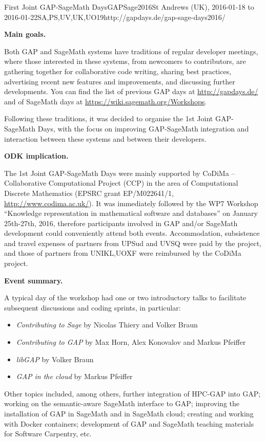 \begin{event}{First Joint GAP-SageMath Days}{GAPSage2016}{St Andrews (UK),
2016-01-18 to 2016-01-22}{SA,PS,UV,UK,UO}{19}{http://gapdays.de/gap-sage-days2016/}

\textbf{Main goals.}

Both GAP and SageMath systems have traditions of regular developer meetings, where those
interested in these systems, from newcomers to contributors, are gathering together for
collaborative code writing, sharing best practices, advertising recent new features and
improvements, and discussing further developments. You can find the list of previous GAP 
days at \url{http://gapdays.de/} and of SageMath days at \url{https://wiki.sagemath.org/Workshops}.

Following these traditions, it was decided to organise the 1st Joint GAP-SageMath Days, with the
focus on improving GAP-SageMath integration and interaction between these systems and between
their developers.

\textbf{ODK implication.} 

The 1st Joint GAP-SageMath Days were mainly supported by CoDiMa -- Collaborative Computational
Project (CCP) in the area of Computational Discrete Mathematics (EPSRC grant EP/M022641/1,
\url{http://www.codima.ac.uk/}). It was immediately followed by the WP7 Workshop ``Knowledge
representation in mathematical software and databases'' on January 25th-27th, 2016, therefore
\ODK participants involved in GAP and/or SageMath development could conveniently attend
both events. Accommodation, subsistence and travel expenses of partners from UPSud and UVSQ
were paid by the \ODK project, and those of partners from UNIKL,UOXF were reimbursed
by the CoDiMa project.

\textbf{Event summary.} 

A typical day of the workshop had one or two introductory talks to facilitate subsequent
discussions and coding sprints, in particular:
\begin{itemize}
\item \emph{Contributing to Sage} by Nicolas Thiery and Volker Braun
\item \emph{Contributing to GAP } by Max Horn, Alex Konovalov and Markus Pfeiffer
\item \emph{libGAP} by Volker Braun
\item \emph{GAP in the cloud} by Markus Pfeiffer
\end{itemize}
Other topics included, among others,
further integration of HPC-GAP into GAP;
working on the semantic-aware SageMath interface to GAP;
improving the installation of GAP in SageMath and in SageMath cloud;
creating and working with Docker containers;
development of GAP and SageMath teaching materials for Software Carpentry,
etc.


\end{event}
